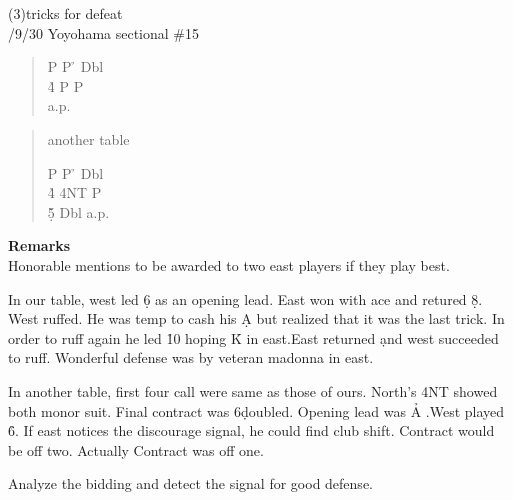 \vspace{0.5cm}
(3){tricks for defeat}\\
/9/30 Yoyohama sectional \#15
\begin{quote}
%
  {}%
  {}%
  {}%
  {}%
  \end{quote}
\begin{quote}
\begin{bidding}
P \> P \h \> Dbl \\
4\h \> P \> P \s \\
 a.p.
\end{bidding}
\end{quote}
\begin{quote}
another table
\begin{bidding}
P \> P \h \> Dbl \\
4\h \> 4NT \> P \d \\
5\h {}\d \> Dbl \> a.p.
\end{bidding}
\end{quote}
{\bf Remarks}\\

Honorable mentions to be awarded to two
east players if they play best.

In our table, west led \d 6 as an opening lead.
East won with ace and retured \d 8. West ruffed.
He was temp to cash his \d A but realized that
it was the last trick. In order to ruff again he led
\h 10 hoping \h K in east.East returned \d and west succeeded
to ruff. Wonderful defense was by veteran madonna in east.

In another table, first four call were same as those of ours.
North's 4NT showed both monor suit. Final contract was 6\d  doubled.
Opening lead was \h A .West played \h 6. 
If east notices the discourage signal,
he could find club shift. Contract would be off two.
Actually Contract was off one.

Analyze the bidding and detect the signal for good defense.
